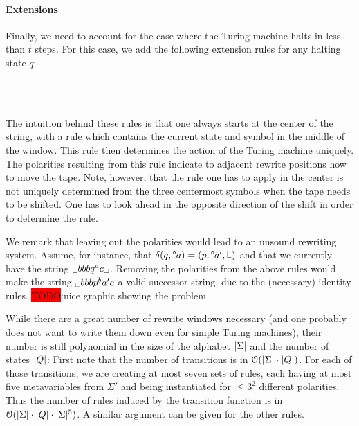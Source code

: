 \documentclass[a4paper,UKenglish,cleveref, autoref]{lipics-v2019}
\newcommand{\TODO}[1]{\colorbox{red}{\LARGE TODO}:#1}
\newcommand{\bigO}[1]{\mathcal{O}{(#1)}}
\begin{document}
\paragraph*{Extensions}
Finally, we need to account for the case where the Turing machine halts in less than $t$ steps. For this case, we add the following extension rules for any halting state $q$: 
\begin{center}
   \\[3ex]
   \\[3ex]
\end{center}

The intuition behind these rules is that one always starts at the center of the string, with a rule which contains the current state and symbol in the middle of the window. This rule then determines the action of the Turing machine uniquely. The polarities resulting from this rule indicate to adjacent rewrite positions how to move the tape. Note, however, that the rule one has to apply in the center is not uniquely determined from the three centermost symbols when the tape needs to be shifted. One has to look ahead in the opposite direction of the shift in order to determine the rule. 

We remark that leaving out the polarities would lead to an unsound rewriting system. Assume, for instance, that $\delta(q, \degree a) = (p, \degree a', \textsf{L})$ and that we currently have the string $\blank bbbq^a c \blank$. Removing the polarities from the above rules would make the string $\blank b b b p^b a' c$ a valid successor string, due to the (necessary) identity rules.
\TODO{nice graphic showing the problem}

While there are a great number of rewrite windows necessary (and one probably does not want to write them down even for simple Turing machines), their number is still polynomial in the size of the alphabet $|\Sigma|$ and the number of states $|Q|$: First note that the number of transitions is in $\bigO{\length{\Sigma} \cdot \length{Q}}$. For each of those transitions, we are creating at most seven sets of rules, each having at most five metavariables from $\Sigma'$ and being instantiated for $\le 3^2$ different polarities. Thus the number of rules induced by the transition function is in $\bigO{\length{\Sigma} \cdot \length{Q} \cdot \length{\Sigma}^5}$. 
A similar argument can be given for the other rules. 
\end{document}
